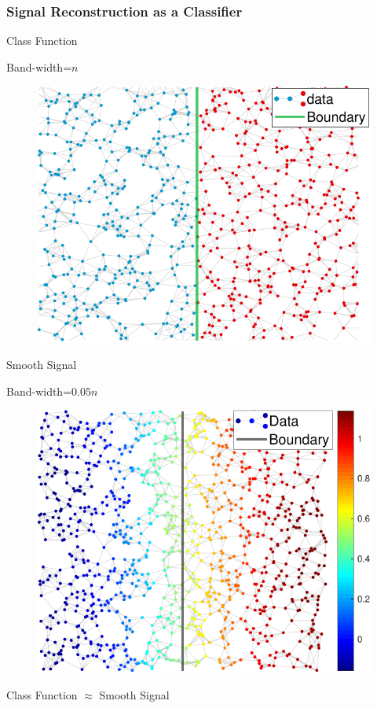 \documentclass[11pts]{beamer}
\begin{document}
\begin{frame}%
\frametitle{Signal Reconstruction as a Classifier}
\begin{minipage}{0.45\textwidth}
\centering
Class Function

Band-width=$n$
\vspace{0.3cm}
\begin{figure}
    \centering
 \includegraphics[scale=0.4]{IM/CLAS.pdf}
\end{figure}
    \end{minipage}
    \hfill
    \begin{minipage}{0.45\textwidth}
    \centering
    Smooth Signal
    
Band-width=$0.05n$
  \begin{figure}
     \centering
     \includegraphics[scale=0.4]{IM/SMOOTH.pdf}
 \end{figure}
    \end{minipage}
\begin{center}
    Class Function $\approx$ Smooth Signal
\end{center}

\end{frame}
\end{document}
